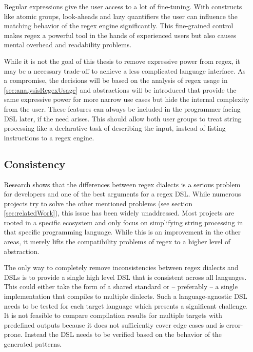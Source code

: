 Regular expressions give the user access to a lot of fine-tuning. With constructs like atomic groups, look-aheads and lazy quantifiers the user can influence the matching behavior of the regex engine significantly. This fine-grained control makes regex a powerful tool in the hands of experienced users but also causes mental overhead and readability problems. 

While it is not the goal of this thesis to remove expressive power from regex, it may be a necessary trade-off to achieve a less complicated language interface. As a compromise, the decisions will be based on the analysis of regex usage in \ref{sec:analysisRegexUsage}
and abstractions will be introduced that provide the same expressive power for more narrow use cases but hide the internal complexity from the user. These features can always be included in the programmer facing DSL later, if the need arises. This should allow both user groups to treat string processing like a declarative task of describing the input, instead of listing instructions to a regex engine.

\subsection{Consistency}

Research shows that the differences between regex dialects is a serious problem for developers \cite{RegexNotLinguaFranca} and one of the best arguments for a regex DSL. While numerous projects try to solve the other mentioned problems (see section \ref{sec:relatedWork}), this issue has been widely unaddressed.
Most projects are rooted in a specific ecosystem and only focus on simplifying string processing in that specific programming language. While this is an improvement in the other areas, it merely lifts the compatibility problems of regex to a higher level of abstraction.

The only way to completely remove inconsistencies between regex dialects and DSLs is to provide a single high level DSL that is consistent across all languages. This could either take the form of a shared standard or -- preferably -- a single implementation that compiles to multiple dialects. Such a language-agnostic DSL needs to be tested for each target language which presents a significant challenge. 
It is not feasible to compare compilation results for multiple targets with predefined outputs because it does not sufficiently cover edge cases and is error-prone. Instead the DSL needs to be verified based on the behavior of the generated patterns.

